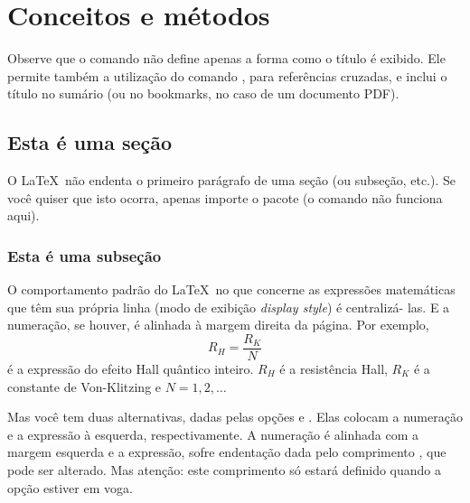 \documentclass[a4paper,12pt]{report}
\begin{document}
	\chapter{Conceitos e métodos}\label{ch:conceitos}
	
	Observe que o comando  não define apenas a forma como o título
	é exibido. Ele permite também a utilização do comando , para
	referências cruzadas, e inclui o título no sumário (ou no bookmarks, no caso
	de um documento PDF).
	
	\section{Esta é uma seção}\label{sec:secao}
		
	O \LaTeX\ não endenta o primeiro parágrafo de uma seção (ou subseção, etc.).
	Se você quiser que isto ocorra, apenas importe o pacote  (o
	comando  não funciona aqui).
	
	\subsection{Esta é uma subseção}\label{sec:subsecao}
	
		
	O comportamento padrão do \LaTeX\ no que concerne as expressões matemáticas
	que têm sua própria linha (modo de exibição \emph{display style}) é centralizá-%
	las. E a numeração, se houver, é alinhada à margem direita da página. Por
	exemplo,
	\begin{equation}\label{eq:QHE}
		R_H = \frac{R_K}{N}
	\end{equation}
	é a expressão do efeito Hall quântico inteiro. $R_H$ é a resistência Hall, $R_K$
	é a constante de Von-Klitzing e $N = 1, 2, \ldots$

	Mas você tem duas alternativas, dadas pelas opções  e .
	Elas colocam a numeração e a expressão à esquerda, respectivamente. A numeração
	é alinhada com a margem esquerda e a expressão, sofre endentação dada pelo
	comprimento , que pode ser alterado. Mas atenção: este	comprimento
	só estará definido quando a opção  estiver em voga.
	
\end{document}
